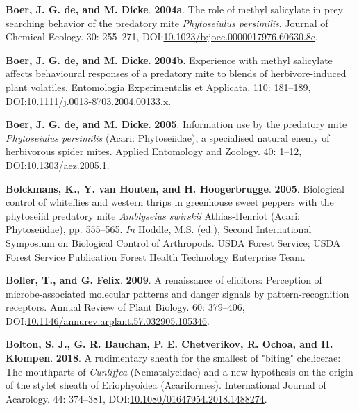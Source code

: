 \documentclass[12pt,final,CPage]{ufthesis}
\newlength{\cslhangindent}
\newenvironment{CSLReferences}[2] %
{%
	\setlength{\parindent}{0pt}
	\ifodd #1 \everypar{\setlength{\hangindent}{\cslhangindent}}\ignorespaces\fi
	\ifnum #2 > 0
	\setlength{\parskip}{#2\baselineskip}
	\fi
}%
{}
\begin{document}
{\begin{CSLReferences}{1}{0}
  \leavevmode{}%
  \textbf{Boer, J. G. de, and M. Dicke}. \textbf{2004a}. The role of methyl salicylate in prey searching behavior of the predatory mite {\emph{Phytoseiulus persimilis}}. Journal of Chemical Ecology. 30: 255--271, DOI:\href{https://doi.org/10.1023/b:joec.0000017976.60630.8c}{10.1023/b:joec.0000017976.60630.8c}.

  \leavevmode{}%
  \textbf{Boer, J. G. de, and M. Dicke}. \textbf{2004b}. Experience with methyl salicylate affects behavioural responses of a predatory mite to blends of herbivore-induced plant volatiles. Entomologia Experimentalis et Applicata. 110: 181--189, DOI:\href{https://doi.org/10.1111/j.0013-8703.2004.00133.x}{10.1111/j.0013-8703.2004.00133.x}.

  \leavevmode{}%
  \textbf{Boer, J. G. de, and M. Dicke}. \textbf{2005}. Information use by the predatory mite {\emph{Phytoseiulus persimilis}} {({Acari}: {Phytoseiidae})}, a specialised natural enemy of herbivorous spider mites. Applied Entomology and Zoology. 40: 1--12, DOI:\href{https://doi.org/10.1303/aez.2005.1}{10.1303/aez.2005.1}.

  \leavevmode{}%
  \textbf{Bolckmans, K., Y. van Houten, and H. Hoogerbrugge}. \textbf{2005}. Biological control of whiteflies and western thrips in greenhouse sweet peppers with the phytoseiid predatory mite {\emph{Amblyseius swirskii}} {Athias-Henriot} ({Acari}: {Phytoseiidae}), pp. 555--565. \emph{In} Hoddle, M.S. (ed.), Second International Symposium on Biological Control of Arthropods. USDA Forest Service; USDA Forest Service Publication Forest Health Technology Enterprise Team.

  \leavevmode{}%
  \textbf{Boller, T., and G. Felix}. \textbf{2009}. A renaissance of elicitors: Perception of microbe-associated molecular patterns and danger signals by pattern-recognition receptors. Annual Review of Plant Biology. 60: 379--406, DOI:\href{https://doi.org/10.1146/annurev.arplant.57.032905.105346}{10.1146/annurev.arplant.57.032905.105346}.

  \leavevmode{}%
  \textbf{Bolton, S. J., G. R. Bauchan, P. E. Chetverikov, R. Ochoa, and H. Klompen}. \textbf{2018}. A rudimentary sheath for the smallest of "biting" chelicerae: The mouthparts of {\emph{Cunliffea}} ({Nematalycidae}) and a new hypothesis on the origin of the stylet sheath of {Eriophyoidea} ({Acariformes}). International Journal of Acarology. 44: 374--381, DOI:\href{https://doi.org/10.1080/01647954.2018.1488274}{10.1080/01647954.2018.1488274}.


\end{CSLReferences}}
\end{document}
